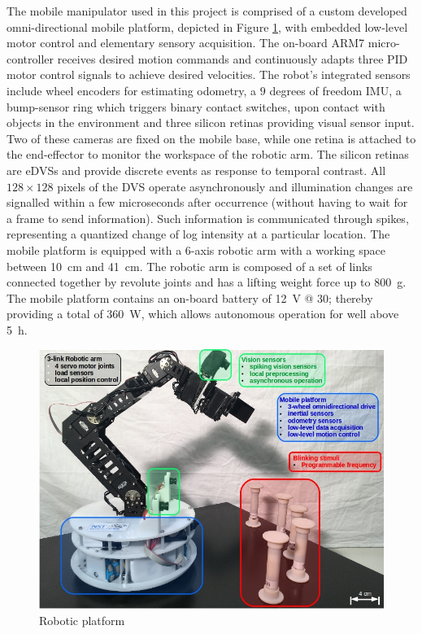 The mobile manipulator used in this project is comprised of a custom developed omni-directional mobile platform, depicted in Figure \ref{fig:omniarmbot}, with embedded low-level motor control and elementary sensory acquisition. 
The on-board ARM7 micro-controller receives desired motion commands and continuously adapts three PID motor control signals to achieve desired velocities. 
The robot's integrated sensors include wheel encoders for estimating odometry, a $9$ degrees of freedom \ac{IMU}, a bump-sensor ring which triggers binary contact switches, upon contact with objects in the environment and three silicon retinas providing visual sensor input. 
Two of these cameras are fixed on the mobile base, while one retina is attached to the end-effector to monitor the workspace of the robotic arm. 
The silicon retinas are \acp{eDVS} and provide discrete events as response to temporal contrast. 
All $128 \times 128$ pixels of the \ac{DVS} operate asynchronously and illumination changes are signalled within a few microseconds after occurrence (without having to wait for a frame to send information). 
Such information is communicated through spikes, representing a quantized change of log intensity at a particular location. 
The mobile platform is equipped with a $6$-axis robotic arm with a working space between \SI{10}{\centi\metre} and \SI{41}{\centi\metre}. 
The robotic arm is composed of a set of links connected together by revolute joints and has a lifting weight force up to \SI{800}{\gram}. 
The mobile platform contains an on-board battery of \SI{12}{\volt} @ \SI{30}{\amperehour}; thereby providing a total of \SI{360}{\watt}, which allows autonomous operation for well above \SI{5}{\hour}.

\begin{figure}[t]
    \centering
    \includegraphics[width=0.8\linewidth]{imgs/omniarmbot.png}
    \caption{Robotic platform}
    \label{fig:omniarmbot}
\end{figure}

